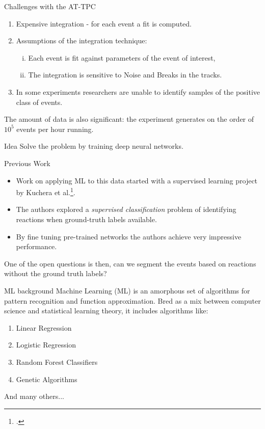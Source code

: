 \documentclass{beamer}
\begin{document}
\begin{frame}[t]{Challenges with the AT-TPC}
	\begin{enumerate}[I]
		\item Expensive integration - for each event a fit is computed.
		\item Assumptions of the integration technique: 
			\begin{enumerate}[(i)]
				\item Each event is fit against parameters of the event of interest,
				\item The integration is sensitive to Noise and Breaks in the tracks.
			\end{enumerate}
		\item In some experiments researchers are unable to identify samples of the positive class of events.
	\end{enumerate}
	The amount of data is also significant: the experiment generates on the order of $10^5$ events per hour running.
	\begin{block}{Idea}
		Solve the problem by training deep neural networks.
	\end{block}
\end{frame}

\begin{frame}[t]{Previous Work}
	\begin{itemize}
		\item Work on applying ML to this data started with a supervised learning project by Kuchera et al.\footcite{Kuchera2019}.
		\item The authors explored a \textit{supervised classification} problem of identifying reactions when ground-truth labels available.
		\item By fine tuning pre-trained networks the authors achieve very impressive performance.
	\end{itemize}
	One of the open questions is then, can we segment the events based on reactions without the ground truth labels?
\end{frame}

\begin{frame}[t]{ML background}
	Machine Learning (ML) is an amorphous set of algorithms for pattern recognition and function approximation. Bred as a mix between computer science and statistical learning theory, it includes algorithms like: 
	\begin{enumerate}[I]
		\item Linear Regression
		\item Logistic Regression
		\item Random Forest Classifiers
		\item Genetic Algorithms 
	\end{enumerate}
	And many others...
\end{frame}
\end{document}
